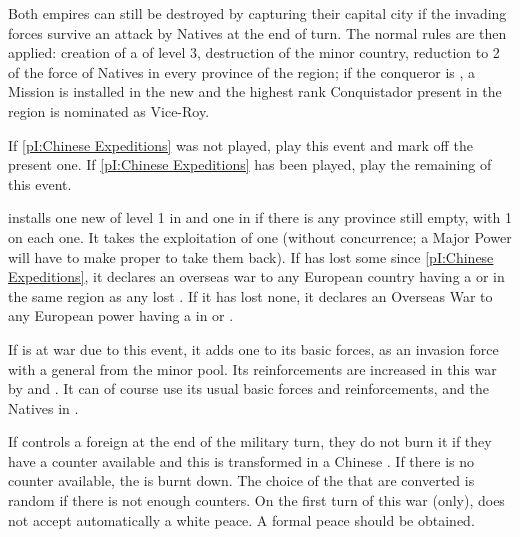 \aparag Both empires can still be destroyed by capturing their capital city if
the invading forces survive an attack by Natives at the end of turn. The
normal rules are then applied: creation of a \COL of level 3, destruction of
the minor country, reduction to 2 \DT of the force of Natives in every
province of the region; if the conqueror is \SPA, a Mission is installed in
the new \COL and the highest rank Conquistador present in the region is
nominated as Vice-Roy.





\condition{}
\aparag If \ref{pI:Chinese Expeditions} was not played, play this event and
mark off the present one.
\aparag If \ref{pI:Chinese Expeditions} has been played, play the remaining of
this event.

\phevnt
\aparag \paysChine installs one new \TP of level 1 in \granderegionFormose and
one in \granderegionPhilippines if there is any province still empty, with 1
\DT on each one. It takes the exploitation of one 
(without concurrence; a Major Power will have to make proper \CONC to take
them back).
\aparag If \paysChine has lost some \TP since \ref{pI:Chinese Expeditions}, it
declares an overseas war to any European country having a \TP or \COL in the
same region as any lost \TP. If it has lost none, it declares an Overseas War
to any European power having a \TP in \granderegionFormose or
\granderegionPhilippines.

\phmil
\aparag If \paysChine is at war due to this event, it adds one \ARMY\faceplus
to its basic forces, as an invasion force with a general from the minor
pool. Its reinforcements are increased in this war by \LD and \ND. It can of
course use its usual basic forces and reinforcements, and the Natives in
\paysChine.

\phpaix
\aparag If \paysChine controls a foreign \TP at the end of the military turn,
they do not burn it if they have a \TP counter available and this \TP is
transformed in a Chinese \TP. If there is no counter available, the \TP is
burnt down. The choice of the \TP that are converted is random if there is not
enough counters.
\aparag On the first turn of this war (only), \paysChine does not accept
automatically a white peace. A formal peace should be obtained.



